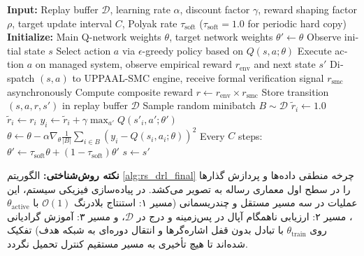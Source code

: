 \documentclass[oneside,openany,phd]{TMU-Thesis}
\begin{document}
\begin{algorithm}[H]
\caption{آموزش و به‌روزرسانی جامع چارچوب پایه‌ای }
\label{alg:rs_drl_final}
\begin{latin}
\small
\begin{algorithmic}[1]
\STATE \textbf{Input:} Replay buffer $\mathcal{D}$, learning rate $\alpha$, discount factor $\gamma$, reward shaping factor $\rho$, target update interval $C$, Polyak rate $\tau_{\text{soft}}$ ($\tau_{\text{soft}}=1.0$ for periodic hard copy)
\STATE \textbf{Initialize:} Main Q-network weights $\theta$, target network weights $\theta' \leftarrow \theta$
  \STATE Observe initial state $s$
    \STATE Select action $a$ via $\epsilon$-greedy policy based on $Q(s, a; \theta)$
    \STATE Execute action $a$ on managed system, observe empirical reward $r_{\text{env}}$ and next state $s'$
    \STATE Dispatch $(s, a)$ to UPPAAL-SMC engine, receive formal verification signal $r_{\text{smc}}$ asynchronously
    \STATE Compute composite reward $r \leftarrow r_{\text{env}} \times r_{\text{smc}}$
    \STATE Store transition $(s, a, r, s')$ in replay buffer $\mathcal{D}$
    \STATE Sample random minibatch $B \sim \mathcal{D}$
        \STATE $\tilde{r}_i \leftarrow 1.0$ 
      \ELSE
        \STATE $\tilde{r}_i \leftarrow r_i$
      \ENDIF
      \STATE $y_i \leftarrow \tilde{r}_i + \gamma \max_{a'} Q(s'_i, a'; \theta')$ 
    \ENDFOR
    \STATE $\theta \leftarrow \theta - \alpha \nabla_\theta \frac{1}{|B|} \sum_{i \in B} (y_i - Q(s_i, a_i; \theta))^2$ 
    \STATE Every $C$ steps: $\theta' \leftarrow \tau_{\text{soft}}\theta + (1-\tau_{\text{soft}})\theta'$ 
    \STATE $s \leftarrow s'$
  \ENDWHILE
\ENDFOR
\end{algorithmic}
\end{latin}
\begin{flushleft}
\footnotesize
\textbf{نکته روش‌شناختی:} الگوریتم \ref{alg:rs_drl_final} چرخه منطقی داده‌ها و پردازش گذارها را در سطح اول معماری رساله به تصویر می‌کشد. در پیاده‌سازی فیزیکی سیستم، این عملیات در سه مسیر مستقل و چندریسمانی (مسیر ۱: استنتاج بلادرنگ $\mathcal{O}(1)$ با $\theta_{\text{active}}$، مسیر ۲: ارزیابی ناهمگام آپال در پس‌زمینه و درج در $\mathcal{D}$، و مسیر ۳: آموزش گرادیانی روی $\theta_{\text{train}}$ با تبادل بدون قفل اشاره‌گرها و انتقال دوره‌ای به شبکه هدف) تفکیک شده‌اند تا هیچ تأخیری به مسیر مستقیم کنترل تحمیل نگردد.
\end{flushleft}
\end{algorithm}
\end{document}
